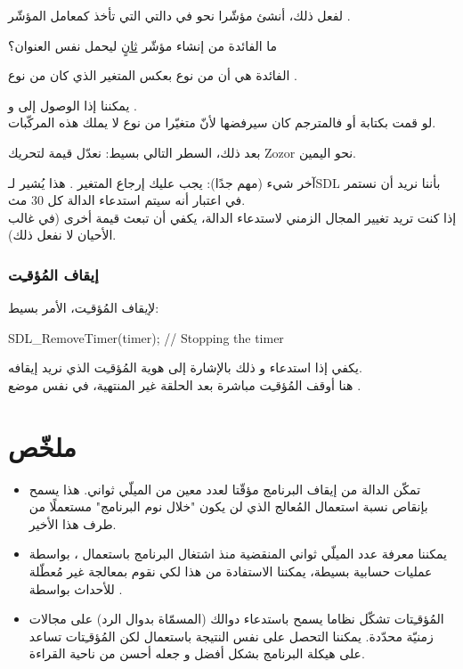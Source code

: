 لفعل ذلك، أنشئ مؤشّرا نحو
في دالتي التي تأخذ كمعامل المؤشّر 
.

\begin{question}
ما الفائدة من إنشاء مؤشّر \underline{ثانٍ} ليحمل نفس العنوان؟
\end{question}

الفائدة هي أن
من نوع
بعكس المتغير
الذي كان من نوع
.

يمكننا إذا الوصول إلى
و
.\\
لو قمت بكتابة
أو
فالمترجم كان سيرفضها لأنّ متغيّرا من نوع
لا يملك هذه المركّبات.

بعد ذلك، السطر التالي بسيط: نعدّل قيمة
لتحريك
\textenglish{Zozor}
نحو اليمين.

آخر شيء (مهم جدًا): يجب عليك إرجاع المتغير
.
 هذا يُشير لـ\textenglish{SDL}
بأننا نريد أن نستمر في اعتبار أنه سيتم استدعاء الدالة كل 30 مث.\\
إذا كنت تريد تغيير المجال الزمني لاستدعاء الدالة، يكفي أن تبعث قيمة أخرى (في غالب الأحيان لا نفعل ذلك).

\subsubsection{إيقاف  المُؤقـِت}

لإيقاف المُؤقـِت، الأمر بسيط:

\begin{Csource}
SDL_RemoveTimer(timer); // Stopping the timer
\end{Csource}

 يكفي إذا استدعاء
و ذلك بالإشارة إلى هوية المُؤقـِت الذي نريد إيقافه.\\
هنا أوقف المُؤقـِت مباشرة بعد الحلقة غير المنتهية، في نفس موضع
.

\section*{ملخّص}

\begin{itemize}
	\item تمكّن الدالة 
	من إيقاف البرنامج مؤقّتا لعدد معين من الميلّي ثواني. هذا يسمح بإنقاص نسبة استعمال المُعالج الذي لن يكون "خلال نوم البرنامج" مستعملًا من طرف هذا الأخير.
	\item يمكننا معرفة عدد الميلّي ثواني المنقضية منذ اشتغال البرنامج باستعمال 
	،
	بواسطة عمليات حسابية بسيطة، يمكننا الاستفادة من هذا لكي نقوم بمعالجة غير مُعطّلة للأحداث بواسطة
	.
	\item المُؤقـِتات تشكّل نظاما يسمح باستدعاء دوالك (المسمّاة بدوال الرد) على مجالات زمنيّة محدّدة. يمكننا التحصل على نفس النتيجة باستعمال
	لكن المُؤقـِتات تساعد على هيكلة البرنامج بشكل أفضل و جعله أحسن من ناحية القراءة.
\end{itemize}
